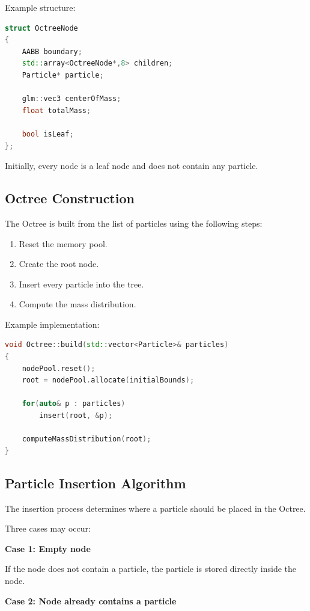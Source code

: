 Example structure:

\begin{lstlisting}[language=C++]
struct OctreeNode
{
    AABB boundary;
    std::array<OctreeNode*,8> children;
    Particle* particle;

    glm::vec3 centerOfMass;
    float totalMass;

    bool isLeaf;
};
\end{lstlisting}

Initially, every node is a leaf node and does not contain any particle.

\subsection{Octree Construction}

The Octree is built from the list of particles using the following steps:

\begin{enumerate}
\item Reset the memory pool.
\item Create the root node.
\item Insert every particle into the tree.
\item Compute the mass distribution.
\end{enumerate}

Example implementation:

\begin{lstlisting}[language=C++]
void Octree::build(std::vector<Particle>& particles)
{
    nodePool.reset();
    root = nodePool.allocate(initialBounds);

    for(auto& p : particles)
        insert(root, &p);

    computeMassDistribution(root);
}
\end{lstlisting}

\subsection{Particle Insertion Algorithm}

The insertion process determines where a particle should be placed in the Octree.

Three cases may occur:

\textbf{Case 1: Empty node}

If the node does not contain a particle, the particle is stored directly inside the node.

\textbf{Case 2: Node already contains a particle}

